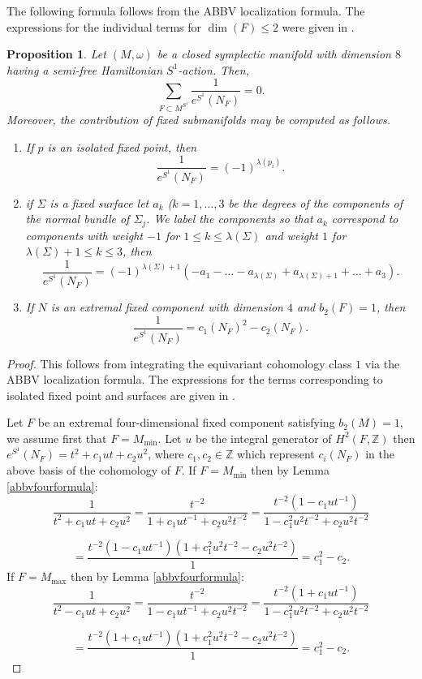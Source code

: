 \documentclass[12pt]{article}
\newtheorem{proposition}[theorem]{Proposition}
\begin{document}
The following formula follows from the ABBV localization formula. The expressions for the individual terms for $\dim(F) \leq 2$ were given in \cite[Remark 2.5]{T}.
\begin{proposition} \label{abbvone}Let $(M,\omega)$ be a closed symplectic manifold with dimension $8$ having a semi-free Hamiltonian $S^1$-action. Then, $$\sum_{ F \subset M^{S^1} }\frac{1}{e^{S^1}(N_{F})} = 0 .$$ Moreover, the contribution of fixed submanifolds may be computed as follows. \begin{enumerate}\item If $p$ is an isolated fixed point, then $$ \frac{1}{e^{S^1}(N_{F})}  = (-1)^{\lambda(p_{i})} .$$\item  if $\Sigma$ is a fixed surface  let $a_{k}$ ($k=1,\ldots, 3$ be the degrees of the components of the normal bundle of $\Sigma_{j}$. We label the components so that $a_{k}$ correspond to components with weight $-1$ for $1\leq k \leq \lambda(\Sigma)$ and weight $1$ for $\lambda(\Sigma) +1\leq k \leq 3$, then $$ \frac{1}{e^{S^1}(N_{F})}  =  (-1)^{\lambda(\Sigma) +1} ( - a_{1} -  \ldots - a_{ \lambda(\Sigma)} +  a_{\lambda(\Sigma) +1} + \ldots +a_{3} ).  $$

\item If $N$ is an extremal fixed component with dimension $4$ and $b_{2}(F)=1$, then $$\frac{1}{e^{S^1}(N_{F})} = c_{1}(N_{F})^2 -c_{2}(N_{F}).$$ 
\end{enumerate}
\end{proposition}
\begin{proof}
This follows from integrating the equivariant cohomology class $1$ via the ABBV localization formula. The expressions for the terms corresponding to isolated fixed point and surfaces are given in \cite[Remark 2.5]{T}.

Let $F$ be an extremal four-dimensional fixed component satisfying $b_{2}(M)=1$, we assume first that $F = M_{\min}$. Let $u$ be the integral generator of $H^{2}(F, \mathbb{Z})$ then $e^{S^1}(N_F) = t^2 + c_{1} u t + c_{2} u^2$, where $c_{1},c_{2} \in \mathbb{Z}$ which represent $c_{i}(N_{F})$ in the above basis of the cohomology of $F$. If $F = M_{\min}$ then by Lemma \ref{abbvfourformula}: $$ \frac{1}{ t^2 + c_{1} u t + c_{2} u^2} =  \frac{t^{-2}}{ 1 + c_{1} u t^{-1} + c_{2} u^2t^{-2} }  =   \frac{t^{-2} (1 - c_{1} u t^{-1})}{ 1 - c_{1}^2 u^2 t^{-2} + c_{2} u^2t^{-2} }  $$

$$= \frac{t^{-2} (1 - c_{1} u t^{-1})(1 + c_{1}^2 u^2 t^{-2} - c_{2} u^2t^{-2})}{ 1}  = c_{1}^2 -c_2.$$
 If $F = M_{\max}$ then by Lemma \ref{abbvfourformula}:  $$ \frac{1}{ t^2 - c_{1} u t + c_{2} u^2} =  \frac{t^{-2}}{ 1 - c_{1} u t^{-1} + c_{2} u^2t^{-2} }  =   \frac{t^{-2} (1 + c_{1} u t^{-1})}{ 1 - c_{1}^2 u^2 t^{-2} + c_{2} u^2t^{-2} }  $$

$$= \frac{t^{-2} (1 + c_{1} u t^{-1})(1 + c_{1}^2 u^2 t^{-2} - c_{2} u^2t^{-2})}{ 1}  = c_{1}^2 -c_2.$$
\end{proof}
\end{document}
